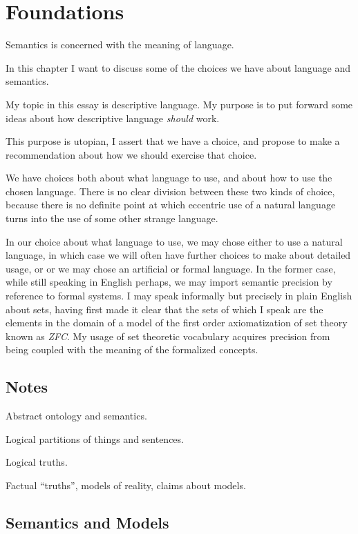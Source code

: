 \chapter{Foundations}\label{Foundations}

Semantics is concerned with the meaning of language.

In this chapter I want to discuss some of the choices we have about language and semantics.



My topic in this essay is descriptive language.
My purpose is to put forward some ideas about how descriptive language {\it should} work.

This purpose is utopian, I assert that we have a choice, and propose to make a recommendation about how we should exercise that choice.

We have choices both about what language to use, and about how to use the chosen language.
There is no clear division between these two kinds of choice, because there is no definite point at which eccentric use of a natural language turns into the use of some other strange language.

In our choice about what language to use, we may chose either to use a natural language, in which case we will often have further choices to make about detailed usage, or or we may chose an artificial or formal language.
In the former case, while still speaking in English perhaps, we may import semantic precision by reference to formal systems.
I may speak informally but precisely in plain English about sets, having first made it clear that the sets of which I speak are the elements in the domain of a model of the first order axiomatization of set theory known as {\it ZFC}.
My usage of set theoretic vocabulary acquires precision from being coupled with the meaning of the formalized concepts. 

\section{Notes}

Abstract ontology and semantics.

Logical partitions of things and sentences.

Logical truths.

Factual ``truths'', models of reality, claims about models.


\section{Semantics and Models}

